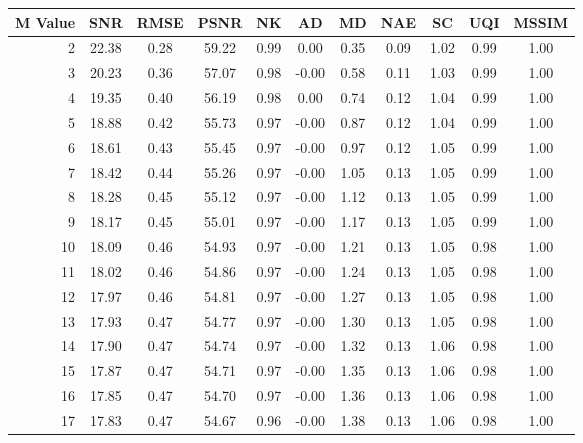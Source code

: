     \begin{table}[htb]
       \small

    \centering 
    \begin{tabular}{|r|cccccccccc|}\hline
   M Value &  SNR &  RMSE &  PSNR &  NK &  AD &  MD &  NAE &  SC &  UQI &  MSSIM \\ \hline 
      2 &  22.38 &  0.28 &  59.22 &  0.99 &  0.00 &  0.35 &  0.09 &  1.02 &  0.99 &  1.00  \\ \hline 
      3 &  20.23 &  0.36 &  57.07 &  0.98 &  -0.00 &  0.58 &  0.11 &  1.03 &  0.99 &  1.00  \\ \hline 
      4 &  19.35 &  0.40 &  56.19 &  0.98 &  0.00 &  0.74 &  0.12 &  1.04 &  0.99 &  1.00  \\ \hline 
      5 &  18.88 &  0.42 &  55.73 &  0.97 &  -0.00 &  0.87 &  0.12 &  1.04 &  0.99 &  1.00  \\ \hline 
      6 &  18.61 &  0.43 &  55.45 &  0.97 &  -0.00 &  0.97 &  0.12 &  1.05 &  0.99 &  1.00  \\ \hline 
      7 &  18.42 &  0.44 &  55.26 &  0.97 &  -0.00 &  1.05 &  0.13 &  1.05 &  0.99 &  1.00  \\ \hline 
      8 &  18.28 &  0.45 &  55.12 &  0.97 &  -0.00 &  1.12 &  0.13 &  1.05 &  0.99 &  1.00  \\ \hline 
      9 &  18.17 &  0.45 &  55.01 &  0.97 &  -0.00 &  1.17 &  0.13 &  1.05 &  0.99 &  1.00  \\ \hline 
      10 &  18.09 &  0.46 &  54.93 &  0.97 &  -0.00 &  1.21 &  0.13 &  1.05 &  0.98 &  1.00  \\ \hline 
      11 &  18.02 &  0.46 &  54.86 &  0.97 &  -0.00 &  1.24 &  0.13 &  1.05 &  0.98 &  1.00  \\ \hline 
      12 &  17.97 &  0.46 &  54.81 &  0.97 &  -0.00 &  1.27 &  0.13 &  1.05 &  0.98 &  1.00  \\ \hline 
      13 &  17.93 &  0.47 &  54.77 &  0.97 &  -0.00 &  1.30 &  0.13 &  1.05 &  0.98 &  1.00  \\ \hline 
      14 &  17.90 &  0.47 &  54.74 &  0.97 &  -0.00 &  1.32 &  0.13 &  1.06 &  0.98 &  1.00  \\ \hline 
      15 &  17.87 &  0.47 &  54.71 &  0.97 &  -0.00 &  1.35 &  0.13 &  1.06 &  0.98 &  1.00  \\ \hline 
      16 &  17.85 &  0.47 &  54.70 &  0.97 &  -0.00 &  1.36 &  0.13 &  1.06 &  0.98 &  1.00  \\ \hline 
      17 &  17.83 &  0.47 &  54.67 &  0.96 &  -0.00 &  1.38 &  0.13 &  1.06 &  0.98 &  1.00  \\ \hline 

\end{tabular}
\end{table}
